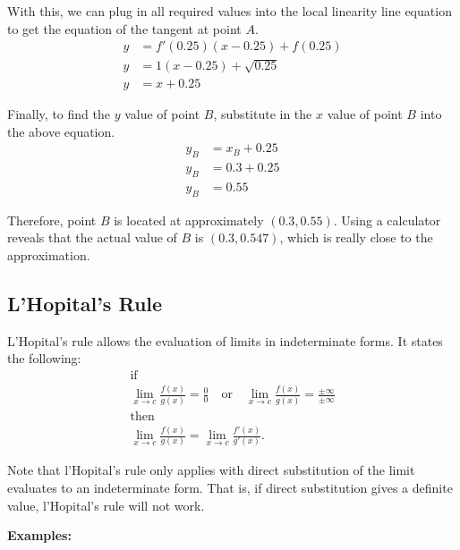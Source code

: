 \documentclass[12pt]{article}
\begin{document}
With this, we can plug in all required values into the local linearity line equation to get the equation of the tangent at point $A$.
\begin{align*}
	y &= f'(0.25) (x - 0.25) + f(0.25) \\
	y &= 1 (x - 0.25) + \sqrt{0.25} \\
	y &= x + 0.25
\end{align*}

Finally, to find the $y$ value of point $B$, substitute in the $x$ value of point $B$ into the above equation.
\begin{align*}
	y_B &= x_B + 0.25 \\
	y_B &= 0.3 + 0.25 \\
	y_B &= 0.55
\end{align*}

Therefore, point $B$ is located at approximately $(0.3, 0.55)$. Using a calculator reveals that the actual value of $B$ is $(0.3, 0.547)$, which is really close to the approximation.

\subsection{L'Hopital's Rule}
L'Hopital's rule allows the evaluation of limits in indeterminate forms. It states the following:
\begin{gather*}
	\text{if} \\
	\lim_{x \to c} \frac{f(x)}{g(x)} = \frac{0}{0} \quad \text{or} \quad \lim_{x \to c} \frac{f(x)}{g(x)} = \frac{\pm \infty}{\pm \infty} \\
	\text{then} \\
	\lim_{x \to c} \frac{f(x)}{g(x)} = \lim_{x \to c} \frac{f'(x)}{g'(x)}.
\end{gather*}

Note that l'Hopital's rule only applies with direct substitution of the limit evaluates to an indeterminate form. That is, if direct substitution gives a definite value, l'Hopital's rule will not work.

\noindent \textbf{Examples:}
\end{document}
